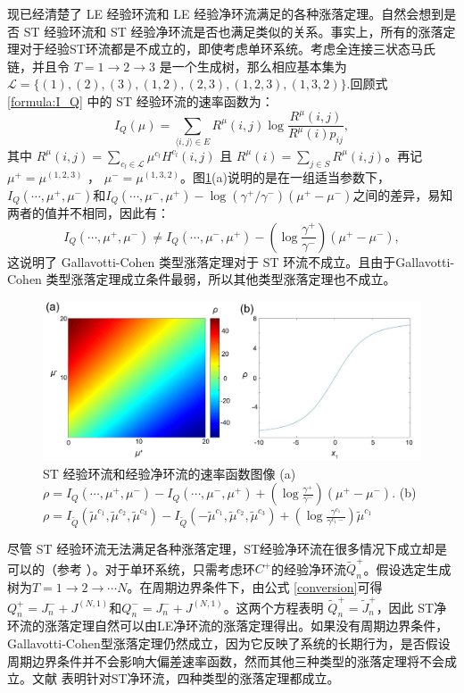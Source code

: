 现已经清楚了 LE 经验环流和 LE 经验净环流满足的各种涨落定理。自然会想到是否 ST 经验环流和 ST 经验净环流是否也满足类似的关系。事实上，所有的涨落定理对于经验ST环流都是不成立的，即使考虑单环系统。考虑全连接三状态马氏链，并且令 $T = 1\to 2\to 3$ 是一个生成树，那么相应基本集为$\mathcal{L} = \{(1),(2),(3),(1,2),(2,3),(1,2,3),(1,3,2)\}.$回顾式 \eqref{formula:I_Q} 中的 ST 经验环流的速率函数为：
\begin{equation*}
I_Q(\mu) = \sum_{\langle i,j\rangle\in E}R^{\mu}(i,j)\log\frac{R^{\mu}(i,j)}{R^{\mu}(i)p_{ij}},
\end{equation*}
其中 $R^{\mu}(i,j)=\sum_{c_l\in\mathcal{L}}\mu^{c_l}H^{c_l}(i,j)$ 且 $R^{\mu}(i)=\sum_{j\in S}R^{\mu}(i,j)$。再记 $\mu^+ = \mu^{(1,2,3)}$ ， $\mu^- = \mu^{(1,3,2)}$。图\ref{figure:ratefunction}(a)说明的是在一组适当参数下，$I_Q(\cdots,\mu^+,\mu^-)$和$I_Q(\cdots,\mu^-,\mu^+)-\log(\gamma^+ /\gamma^-) (\mu^+-\mu^-)$之间的差异，易知两者的值并不相同，因此有：
\begin{equation*}
I_Q(\cdots,\mu^+,\mu^-)
\neq I_Q(\cdots,\mu^-,\mu^+)-\left(\log\frac{\gamma^+}{\gamma^-}\right)(\mu^+-\mu^-),
\end{equation*}
这说明了 Gallavotti-Cohen 类型涨落定理对于 ST 环流不成立。且由于Gallavotti-Cohen 类型涨落定理成立条件最弱，所以其他类型涨落定理也不成立。
\begin{figure}[h]
	\centering
	\includegraphics[scale=0.25]{chart/ratefunction.pdf}
	\caption{ST 经验环流和经验净环流的速率函数图像 (a) $\rho=I_Q(\cdots,\mu^+,\mu^-)-I_Q(\cdots,\mu^-,\mu^+)+(\log\frac{\gamma^+}{\gamma^-})(\mu^+-\mu^-)$. (b) $\rho=I_{\tilde{Q}}(\tilde{\mu}^{c_1},\tilde{\mu}^{c_2},\tilde{\mu}^{c_3})- I_{\tilde{Q}}(-\tilde{\mu}^{c_1},\tilde{\mu}^{c_2},\tilde{\mu}^{c_3})
		+(\log\frac{\gamma^{c_1}}{\gamma^{c_1-}})\tilde{\mu}^{c_1}$}\label{figure:ratefunction}
\end{figure}
尽管 ST 经验环流无法满足各种涨落定理，ST经验净环流在很多情况下成立却是可以的（参考 \cite{andrieux2007fluctuation}）。对于单环系统，只需考虑环$C^+$的经验净环流$\tilde{Q}^+_n$。假设选定生成树为$T = 1 \rightarrow 2 \rightarrow \cdots N$。在周期边界条件下，由公式 \ref{conversion}可得$Q_n^+=J_n^- + J^{(N,1)}$和$Q_n^-=J_n^- + J^{(N,1)}$。这两个方程表明 $\tilde{Q}_n^+ = \tilde{J}_n^+$，因此 ST净环流的涨落定理自然可以由LE净环流的涨落定理得出。如果没有周期边界条件，Gallavotti-Cohen型涨落定理仍然成立，因为它反映了系统的长期行为，是否假设周期边界条件并不会影响大偏差速率函数，然而其他三种类型的涨落定理将不会成立。文献\cite{polettini2014transient} 表明针对ST净环流，四种类型的涨落定理都成立。

